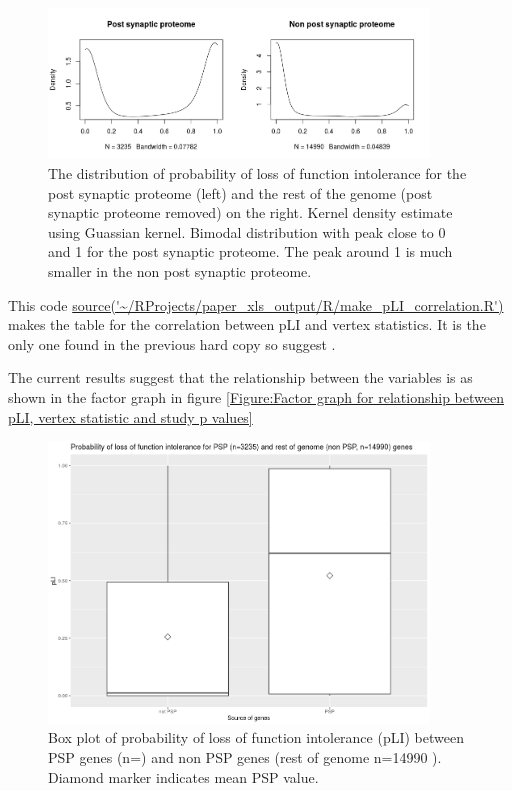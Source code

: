 \begin{figure}
    \centering
    \includegraphics[width=0.9\textwidth]{images/Rplot01_density_PSP_two_panel_nonPSP.png}
    \caption{The distribution of probability of loss of function intolerance for the post synaptic proteome (left) and the rest of the genome (post synaptic proteome removed) on the right. Kernel density estimate using Guassian kernel. Bimodal distribution with peak close to 0 and 1 for the post synaptic proteome. The peak around 1 is much smaller in the non post synaptic proteome. }
    \label{fig:density estimate pLi two panel}
\end{figure}



This code \url{source('~/RProjects/paper_xls_output/R/make_pLI_correlation.R')}
makes the table for the correlation between pLI and vertex statistics. It is the only one found in the previous hard copy so suggest .

The current results suggest that the relationship between the variables is as shown in the factor graph in figure \ref{Figure:Factor graph for relationship between pLI, vertex statistic and study p values}

\begin{figure}
    \centering
    \includegraphics[width=0.9\textwidth]{images/Rplot03_boxplot_pLI_PSP_non_PSP.png}
    \caption{Box plot of probability of loss of function intolerance (pLI) between PSP genes (n=) and non PSP genes (rest of genome n=14990 ). Diamond marker indicates mean PSP value. }
    \label{fig:Boxplot of pli}
\end{figure}

